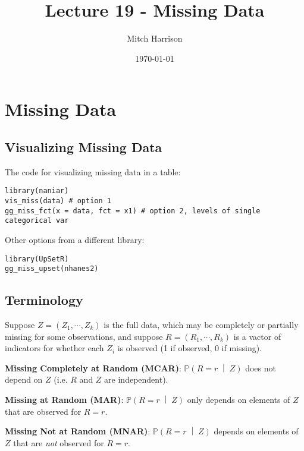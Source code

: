 \documentclass[titlepage, 12pt, leqno]{article}
\title{\Huge{Lecture 19 - Missing Data}}
\author{\large{Mitch Harrison}}
\date{\today}
\begin{document}
\setlength{\parskip}{1\baselineskip}
\setlength{\parindent}{15pt}
\maketitle
\tableofcontents
\newpage


\section{Missing Data}
\subsection{Visualizing Missing Data}
The code for visualizing missing data in a table:
\begin{verbatim}
library(naniar)
vis_miss(data) # option 1
gg_miss_fct(x = data, fct = x1) # option 2, levels of single categorical var
\end{verbatim}

Other options from a different library:
\begin{verbatim}
library(UpSetR)
gg_miss_upset(nhanes2)
\end{verbatim}

\subsection{Terminology}
Suppose $Z = (Z_1, \cdots , Z_k)$ is the full data, which may be completely or
partially missing for some observations, and suppose $R = (R_1, \cdots , R_k)$ is
a vactor of indicators for whether each $Z_i$ is observed (1 if observed, 0 if
missing).

\begin{definition}
    \textbf{Missing Completely at Random (MCAR)}: 
    $ \mathbb{P}\left(R=r \;\middle|\; Z\right) $ does not depend on $Z$ (i.e.
    $R$ and $Z$ are independent).
\end{definition}

\begin{definition}
    \textbf{Missing at Random (MAR)}: 
    $ \mathbb{P}\left(R=r \;\middle|\; Z\right) $ only depends on elements of $Z$
    that are observed for $R=r$.
\end{definition}

\begin{definition}
    \textbf{Missing Not at Random (MNAR)}:
    $ \mathbb{P}\left(R=r \;\middle|\; Z\right) $ depends on elements of $Z$ that 
    are \textit{not} observed for $R=r$.
\end{definition}
\end{document}
